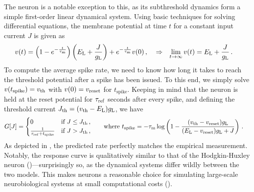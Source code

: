 The \LIF neuron is a notable exception to this, as its subthreshold dynamics form a simple first-order linear dynamical system.
Using basic techniques for solving differential equations, the membrane potential \vMem at time $t$ for a constant input current $J$ is given as
\begin{align}
	v(t) &= \left(1 - e^{-\frac{t}{{\tau_\mathrm{m}}}} \right) \left( E_\mathrm{L} + \frac{J}{g_\mathrm{L}} \right) + e^{-\frac{t}{{\tau_\mathrm{m}}}} v(0) \,, &&\Rightarrow & \lim_{t \to \infty} v(t) &= E_\mathrm{L} + \frac{J}{g_\mathrm{L}} \,.
\end{align}
To compute the average spike rate, we need to know how long it takes to reach the threshold potential after a spike has been issued.
To this end, we simply solve $v(t_\mathrm{spike}) = v_\mathrm{th}$ with $v(0) = v_\mathrm{reset}$ for $t_\mathrm{spike}$.
Keeping in mind that the neuron is held at the reset potential for ${\tau_\mathrm{ref}}$ seconds after every spike, and defining the threshold current $J_\mathrm{th} = (v_\mathrm{th} - E_\mathrm{L}) g_\mathrm{L}$, we have
\begin{align}
	\begin{aligned}
	G[J] &= \begin{cases}
		0 & \text{if } J \leq J_\mathrm{th} \,, \\
		\frac{1}{{\tau_\mathrm{ref}} + t_\mathrm{spike}} & \text{if } J > J_\mathrm{th} \,,
	\end{cases} & \quad
	\text{where }
	t_\mathrm{spike} &=
		-{\tau_\mathrm{m}} \log\left(1 - \frac{(v_\mathrm{th} - v_\mathrm{reset}) g_\mathrm{L}}{(E_\mathrm{L} - v_\mathrm{reset}) g_\mathrm{L} + J} \right) \,.
	\end{aligned}
	\label{eqn:lif_response_curve}
\end{align}
As depicted in , the predicted rate perfectly matches the empirical measurement.
Notably, the \LIF response curve is qualitatively similar to that of the Hodgkin-Huxley neuron ()---surprisingly so, as the dynamical systems differ wildly between the two models.
This makes \LIF neurons a reasonable choice for simulating large-scale neurobiological systems at small computational costs (\cite{meunier2002playing}).

